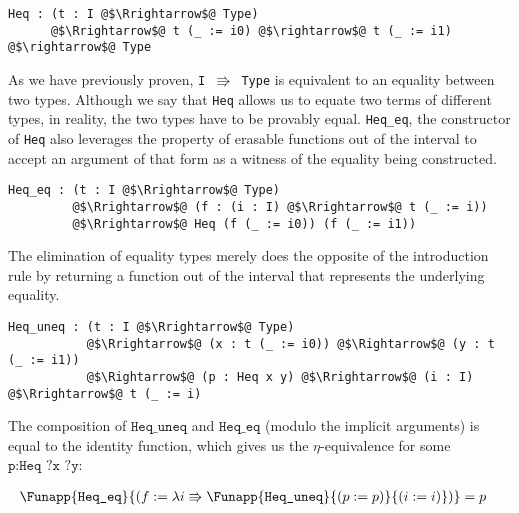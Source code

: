 \documentclass[12pt,twoside,maitrise]{dms}
\theoremstyle{definition}
\numberwithin{equation}{section}
\numberwithin{table}{chapter}
\numberwithin{figure}{chapter}
\newcommand\id[1] {\texttt{#1}}
\newcommand\fn[1] {\texttt{#1}}
\begin{document}
\begin{verbatim}
Heq : (t : I @$\Rrightarrow$@ Type)
      @$\Rrightarrow$@ t (_ := i0) @$\rightarrow$@ t (_ := i1) @$\rightarrow$@ Type
\end{verbatim}

As we have previously proven, \fn{I $\Rrightarrow$ Type} is equivalent to an
equality between two types. Although we say that \fn{Heq} allows us to equate
two terms of different types, in reality, the two types have to be provably
equal. \id{Heq\_eq}, the constructor of \id{Heq} also leverages the property of
erasable functions out of the interval to accept an argument of that form as a
witness of the equality being constructed.


\begin{verbatim}
Heq_eq : (t : I @$\Rrightarrow$@ Type)
         @$\Rrightarrow$@ (f : (i : I) @$\Rrightarrow$@ t (_ := i))
         @$\Rrightarrow$@ Heq (f (_ := i0)) (f (_ := i1))
\end{verbatim}

The elimination of equality types merely does the opposite of the introduction
rule by returning a function out of the interval that represents the underlying
equality.

\begin{verbatim}
Heq_uneq : (t : I @$\Rrightarrow$@ Type)
           @$\Rrightarrow$@ (x : t (_ := i0)) @$\Rightarrow$@ (y : t (_ := i1))
           @$\Rightarrow$@ (p : Heq x y) @$\Rrightarrow$@ (i : I) @$\Rrightarrow$@ t (_ := i)
\end{verbatim}

The composition of $\id{Heq\_uneq}$ and $\id{Heq\_eq}$ (modulo the implicit
arguments) is equal to the identity function, which gives us the
$\eta$-equivalence for some $\fn{p:Heq ?x ?y}$:

\begin{align*}
  & \Funapp{\id{Heq\_eq}}{(\earg{f}{\lambda i \Rrightarrow
      \Funapp{\id{Heq\_uneq}}{(\earg{p}{p})}{(\earg{i}{i})}})} = p
\end{align*}
\end{document}
